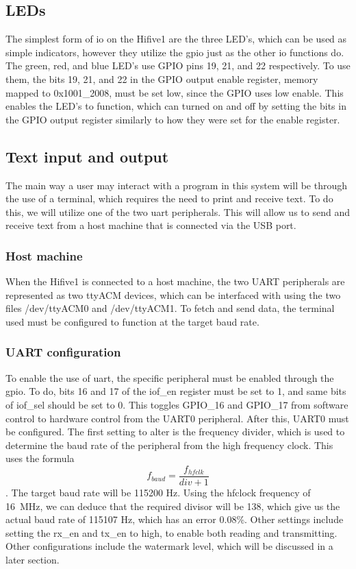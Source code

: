 \subsection{LEDs}
The simplest form of \ac{io} on the Hifive1 are the three LED's, which can be used as simple indicators, however they utilize the \ac{gpio} just as the other \ac{io} functions do. The green, red, and blue LED's use GPIO pins 19, 21, and 22 respectively. To use them, the bits 19, 21, and 22 in the GPIO output enable register, memory mapped to 0x1001\_2008, must be set low, since the GPIO uses low enable. This enables the LED's to function, which can turned on and off by setting the bits in the GPIO output register similarly to how they were set for the enable register.
\subsection{Text input and output}
The main way a user may interact with a program in this system will be through the use of a terminal, which requires the need to print and receive text. To do this, we will utilize one of the two \ac{uart} peripherals. This will allow us to send and receive text from a host machine that is connected via the USB port.
\subsubsection{Host machine}
When the Hifive1 is connected to a host machine, the two UART peripherals are represented as two ttyACM devices, which can be interfaced with using the two files /dev/ttyACM0 and /dev/ttyACM1. To fetch and send data, the terminal used must be configured to function at the target baud rate.
\subsubsection{UART configuration}
To enable the use of \ac{uart}, the specific peripheral must be enabled through the \ac{gpio}. To do, bits 16 and 17 of the iof\_en register must be set to 1, and same bits of iof\_sel should be set to 0. This toggles GPIO\_16 and GPIO\_17 from software control to hardware control from the UART0 peripheral. After this, UART0 must be configured. The first setting to alter is the frequency divider, which is used to determine the baud rate of the peripheral from the high frequency clock. This uses the formula \[f_{baud}=\frac{f_{hfclk}}{div+1}\]. The target baud rate will be 115200 Hz. Using the hfclock frequency of 16~MHz, we can deduce that the required divisor will be 138, which give us the actual baud rate of 115107 Hz, which has an error 0.08\%. Other settings include setting the rx\_en and tx\_en to high, to enable both reading and transmitting. Other configurations include the watermark level, which will be discussed in a later section.
